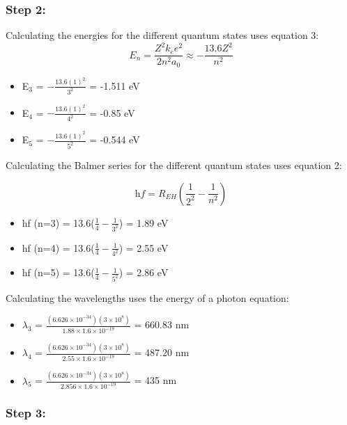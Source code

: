 \documentclass[10pt, letterpaper, twoside]{article}
\begin{document}
\subsubsection{Step 2:}

Calculating the energies for the different quantum states uses equation 3:
\begin{equation*}
    E_n = \frac{Z^2k_ee^2}{2n^2a_0} \approx -\frac{13.6Z^2}{n^2}
\end{equation*}
\begin{itemize}
    \item E$_3$ = $-\frac{13.6(1)^2}{3^2}$ = -1.511 eV
    \item E$_4$ = $-\frac{13.6(1)^2}{4^2}$ = -0.85 eV
    \item E$_5$ = $-\frac{13.6(1)^2}{5^2}$ = -0.544 eV
\end{itemize}

Calculating the Balmer series for the different quantum states uses equation 2:

\begin{equation*}
    \textit{hf} = R_{EH}(\frac{1}{2^2}-\frac{1}{n^2}) 
\end{equation*}

\begin{itemize}
    \item hf (n=3) = 13.6($\frac{1}{4} - \frac{1}{3^2}$) = 1.89 eV
    \item hf (n=4) = 13.6($\frac{1}{4} - \frac{1}{4^2}$) = 2.55 eV
    \item hf (n=5) = 13.6($\frac{1}{4} - \frac{1}{5^2}$) = 2.86 eV
\end{itemize}

Calculating the wavelengths uses the energy of a photon equation:

\begin{itemize}
    \item $\lambda_3$ = $\frac{(6.626\times10^{-34})(3\times10^{8})}{1.88 \times 1.6 \times 10^{-19}}$ = 660.83 nm
    \item $\lambda_4$ = $\frac{(6.626\times10^{-34})(3\times10^{8})}{2.55 \times 1.6 \times 10^{-19}}$ = 487.20 nm
    \item $\lambda_5$ = $\frac{(6.626\times10^{-34})(3\times10^{8})}{2.856 \times 1.6 \times 10^{-19}}$ = 435 nm
\end{itemize}

\subsubsection{Step 3:}
\end{document}
